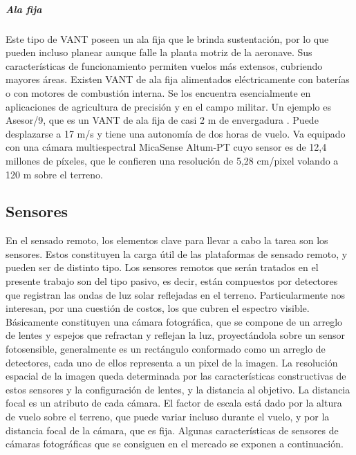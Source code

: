 \subparagraph{Ala fija}
Este tipo de VANT poseen un ala fija que le brinda sustentación, por lo que pueden incluso planear aunque falle la planta motriz de la aeronave. Sus características de funcionamiento permiten vuelos más extensos, cubriendo mayores áreas. Existen VANT de ala fija alimentados eléctricamente con baterías o con motores de combustión interna. Se los encuentra esencialmente en aplicaciones de agricultura de precisión y en el campo militar. Un ejemplo es Asesor/9, que es un VANT de ala fija de casi 2 m de envergadura \cite{noauthor_drone_nodate}. Puede desplazarse a 17 m/s y tiene una autonomía de dos horas de vuelo. Va equipado con una cámara multiespectral MicaSense Altum-PT \cite{noauthor_altum-pt_2023} cuyo sensor es de 12,4 millones de píxeles, que le confieren una resolución de 5,28 cm/pixel volando a 120 m sobre el terreno.

\subsection{Sensores}
En el sensado remoto, los elementos clave para llevar a cabo la tarea son los sensores. Estos constituyen la carga útil de las plataformas de sensado remoto, y pueden ser de distinto tipo.
Los sensores remotos que serán tratados en el presente trabajo son del tipo pasivo, es decir, están compuestos por detectores que registran las ondas de luz solar reflejadas en el terreno. Particularmente nos interesan, por una cuestión de costos, los que cubren el espectro visible. Básicamente constituyen una cámara fotográfica, que se compone de un arreglo de lentes y espejos que refractan y reflejan la luz, proyectándola sobre un sensor fotosensible, generalmente es un rectángulo conformado como un arreglo de detectores, cada uno de ellos representa a un pixel de la imagen. La resolución espacial de la imagen queda determinada por las características constructivas de estos sensores y la configuración de lentes, y la distancia al objetivo. 
 La distancia focal es un atributo de cada cámara. El factor de escala está dado por la altura de vuelo sobre el terreno, que puede variar incluso durante el vuelo, y por la distancia focal de la cámara, que es fija. 
 Algunas características de sensores de cámaras fotográficas que se consiguen en el mercado se exponen a continuación.


\color{black}

